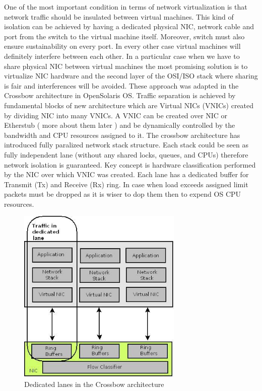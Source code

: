 \documentclass[11pt]{book}
\begin{document}
        One of the most important condition in terms of network virtualization is that network traffic
      should be insulated between virtual machines. This kind of isolation can be achieved by having
      a dedicated physical NIC, network cable and port from the switch to the virtual machine
      itself. Moreover, switch must also ensure sustainability on every port. In every other case
      virtual machines will definitely interfere between each other.
        In a particular case when we have to share physical NIC between virtual machines the most promising solution is to
      virtualize NIC hardware and the second layer of the OSI/ISO stack where sharing is fair and
      interferences will be avoided. These approach was adapted in the Crossbow architecture in
      OpenSolaris OS.
        Traffic separation is achieved by fundamental blocks of new architecture
      which are Virtual NICs (VNICs) created by dividing NIC into many VNICs. 
        A VNIC can be created over NIC or Etherstub ( more about them later ) and be dynamically controlled by the
      bandwidth and CPU resources assigned to it.
        The crossbow architecture has introduced fully paralized network stack structure. Each stack could be seen as fully independent lane (without
      any shared locks, queues, and CPUs) therefore network isolation is guaranteed. Key concept is
      hardware classification performed by the NIC over which VNIC was created. Each lane has a
      dedicated buffer for Transmit (Tx) and Receive (Rx) ring. In case when load exceeds assigned
      limit packets must be dropped as it is wiser to dop them then to expend OS CPU resources. 

      
                 \begin{figure}[H]
                        \begin{center}
                              \includegraphics[width=0.7\textwidth]{img/crossbow-traffic-dedicated-line.jpeg}
                              \caption{Dedicated lanes in the Crossbow architecture}
                        \end{center}
                 \end{figure}
		
\end{document}
